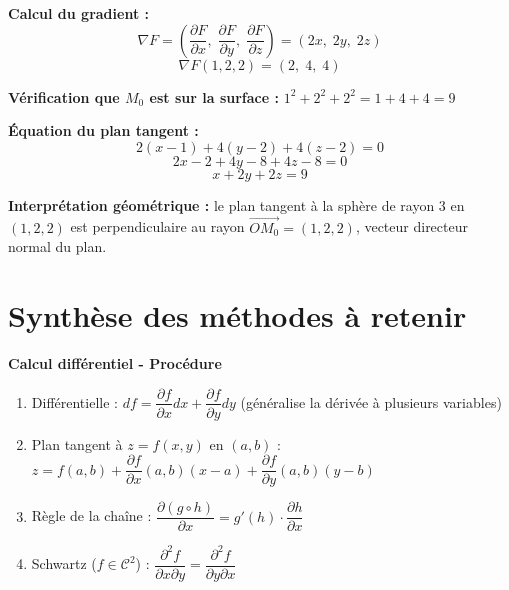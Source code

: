 \documentclass[11pt,a4paper]{article}
\begin{document}
\begin{reponsebox}
\textbf{Calcul du gradient :}
$$\nabla F = \left(\frac{\partial F}{\partial x},\;\frac{\partial F}{\partial y},\;\frac{\partial F}{\partial z}\right) = (2x,\;2y,\;2z)$$
$$\boxed{\nabla F(1,2,2) = (2,\;4,\;4)}$$

\textbf{Vérification que $M_0$ est sur la surface :} $1^2+2^2+2^2 = 1+4+4 = 9$ \checkmark

\textbf{Équation du plan tangent :}
$$2(x-1) + 4(y-2) + 4(z-2) = 0$$
$$2x - 2 + 4y - 8 + 4z - 8 = 0$$
$$\boxed{x + 2y + 2z = 9}$$

\textbf{Interprétation géométrique :} le plan tangent à la sphère de rayon 3 en $(1,2,2)$ est perpendiculaire au rayon $\overrightarrow{OM_0}=(1,2,2)$, vecteur directeur normal du plan.
\end{reponsebox}

\newpage
\section*{\color{bleutexte}Synthèse des méthodes à retenir}

\begin{methodebox}
\textbf{Calcul différentiel - Procédure}
\begin{enumerate}[itemsep=2pt, topsep=2pt]
  \item Différentielle : $df = \dfrac{\partial f}{\partial x}dx + \dfrac{\partial f}{\partial y}dy$ (généralise la dérivée à plusieurs variables)
  \item Plan tangent à $z=f(x,y)$ en $(a,b)$ : $z = f(a,b) + \dfrac{\partial f}{\partial x}(a,b)(x-a) + \dfrac{\partial f}{\partial y}(a,b)(y-b)$
  \item Règle de la chaîne : $\dfrac{\partial(g\circ h)}{\partial x} = g'(h)\cdot\dfrac{\partial h}{\partial x}$
  \item Schwartz ($f\in\mathcal{C}^2$) : $\dfrac{\partial^2 f}{\partial x\partial y} = \dfrac{\partial^2 f}{\partial y\partial x}$
\end{enumerate}
\end{methodebox}

\vspace{6pt}
\end{document}
